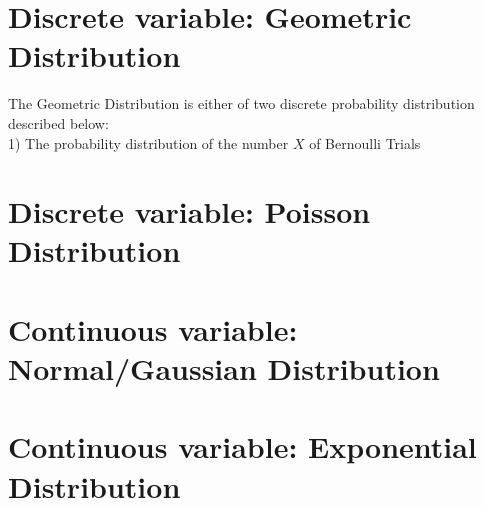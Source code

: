\section{Discrete variable: Geometric Distribution}

The Geometric Distribution is either of two discrete probability distribution described below: \\

1) The probability distribution of the number $X$ of Bernoulli Trials 

\section{Discrete variable: Poisson Distribution}

\section{Continuous variable: Normal/Gaussian Distribution}

\section{Continuous variable: Exponential Distribution}



